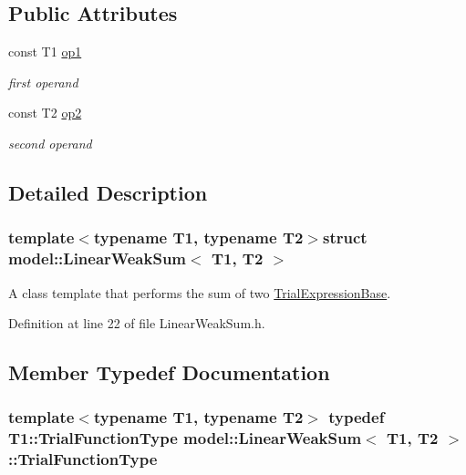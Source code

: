 \subsection*{Public Attributes}
\begin{DoxyCompactItemize}
\item 
const T1 \hyperlink{structmodel_1_1_linear_weak_sum_af18ed368b82c08cba7c6ad17dff216a4}{op1}
\begin{DoxyCompactList}\small\item\em first operand \end{DoxyCompactList}\item 
const T2 \hyperlink{structmodel_1_1_linear_weak_sum_ae427044192d89ac36fc969848bab876c}{op2}
\begin{DoxyCompactList}\small\item\em second operand \end{DoxyCompactList}\end{DoxyCompactItemize}


\subsection{Detailed Description}
\subsubsection*{template$<$typename T1, typename T2$>$struct model\+::\+Linear\+Weak\+Sum$<$ T1, T2 $>$}

A class template that performs the sum of two \hyperlink{structmodel_1_1_trial_expression_base}{Trial\+Expression\+Base}. 

Definition at line 22 of file Linear\+Weak\+Sum.\+h.



\subsection{Member Typedef Documentation}
\hypertarget{structmodel_1_1_linear_weak_sum_a084f607c6baac6ac751f97b00c43b6d1}{}
\subsubsection[{Trial\+Function\+Type}]{\setlength{\rightskip}{0pt plus 5cm}template$<$typename T1, typename T2$>$ typedef T1\+::\+Trial\+Function\+Type {\bf model\+::\+Linear\+Weak\+Sum}$<$ T1, T2 $>$\+::{\bf Trial\+Function\+Type}}\label{structmodel_1_1_linear_weak_sum_a084f607c6baac6ac751f97b00c43b6d1}


